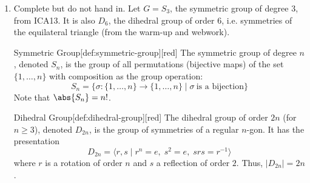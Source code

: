 \begin{enumerate}
  \newpage
  \item Complete but do not hand in.
  Let $G=S_3$, the symmetric group of degree 3, from ICA13. 
  It is also $D_6$, the dihedral group of order 6, i.e. 
  symmetries of the equilateral triangle (from the warm-up and webwork).
  \begin{define}{Symmetric Group}[def:symmetric-group][red]
    The symmetric group of degree $n$, denoted $S_n$, is the group of all permutations (bijective maps) of the set $\{1,\dots,n\}$ with composition as the group operation:
    \[
      S_n=\{\sigma:\{1,\dots,n\}\to\{1,\dots,n\}\mid \sigma\ \text{is a bijection}\}
    \]
    Note that $\abs{S_n}=n!$.
  \end{define}
  \begin{define}{Dihedral Group}[def:dihedral-group][red]
    The dihedral group of order $2n$ (for $n \geq 3$), denoted $D_{2n}$, is the group of symmetries of a 
    regular $n$-gon. It has the presentation
    \[
    D_{2n}=\langle r,s \mid r^n=e,\; s^2=e,\; srs=r^{-1}\rangle
    \]
    where $r$ is a rotation of order $n$ and $s$ a reflection of order $2$. 
    Thus, $\lvert D_{2n}\rvert=2n$. 
    \begin{center}
    \end{center}
  \end{define}




\end{enumerate}
